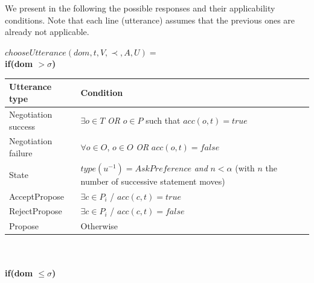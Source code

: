 \documentclass{llncs}
\begin{document}
	We present in the following the possible responses and their applicability conditions. Note that each line (utterance)  assumes that the previous ones are already not applicable.
	
	$ chooseUtterance(dom, t, V, \prec, A, U) = $ \\
	
	
	\textbf{if(\textbf{dom  $>\sigma$})} \\
	\begin{tabular}{|p{3cm}|p{9cm}|}
		\hline
		\textbf{Utterance type} & Condition \\
		\hline
		Negotiation success & $\exists o \in T$   \emph{OR} $o \in P$ such that  $acc(o,t) = true$ \\
		\hline
		Negotiation failure & $ \forall o \in O$,  $o \in O$  \emph{OR} $acc(o,t) = false$\\
		\hline
		State & $type(u^{-1}) = AskPreference$  \textit{ and }
		$n < \alpha$ (with $n$ the number of successive statement moves)\\
		\hline
		AcceptPropose & $\exists c \in P_i$ / $acc(c,t)= true$ \\
		\hline
		RejectPropose & $\exists c \in P_i$ / $acc(c,t)= false$ \\
		\hline
		Propose & Otherwise  \\
		
		\hline
	\end{tabular}
	\\ \\
	
	\textbf{if(\textbf{dom  $ \leq \sigma$})} \\
	
\end{document}
